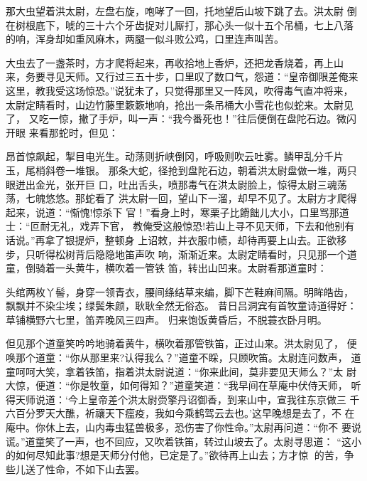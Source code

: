 那大虫望着洪太尉，左盘右旋，咆哮了一回，托地望后山坡下跳了去。洪太尉
倒在树根底下，唬的三十六个牙齿捉对儿厮打，那心头一似十五个吊桶，七上八落
的响，浑身却如重风麻木，两腿一似斗败公鸡，口里连声叫苦。

大虫去了一盏茶时，方才爬将起来，再收拾地上香炉，还把龙香烧着，再上山
来，务要寻见天师。又行过三五十步，口里叹了数口气，怨道：“皇帝御限差俺来
这里，教我受这场惊恐。”说犹未了，只觉得那里又一阵风，吹得毒气直冲将来，
太尉定睛看时，山边竹藤里簌簌地响，抢出一条吊桶大小雪花也似蛇来。太尉见了，
又吃一惊，撇了手炉，叫一声：“我今番死也！”往后便倒在盘陀石边。微闪开眼
来看那蛇时，但见：

昂首惊飙起，掣目电光生。动荡则折峡倒冈，呼吸则吹云吐雾。鳞甲乱分千片
玉，尾梢斜卷一堆银。
那条大蛇，径抢到盘陀石边，朝着洪太尉盘做一堆，两只眼迸出金光，张开巨
口，吐出舌头，喷那毒气在洪太尉脸上，惊得太尉三魂荡荡，七魄悠悠。那蛇看了
洪太尉一回，望山下一溜，却早不见了。太尉方才爬得起来，说道：“惭愧!惊杀下
官！”看身上时，寒栗子比餶飿儿大小，口里骂那道士：“叵耐无礼，戏弄下官，
教俺受这般惊恐!若山上寻不见天师，下去和他别有话说。”再拿了银提炉，整顿身
上诏敕，并衣服巾帻，却待再要上山去。正欲移步，只听得松树背后隐隐地笛声吹
响，渐渐近来。太尉定睛看时，只见那一个道童，倒骑着一头黄牛，横吹着一管铁
笛，转出山凹来。太尉看那道童时：

头绾两枚丫髻，身穿一领青衣，腰间绦结草来编，脚下芒鞋麻间隔。明眸皓齿，
飘飘并不染尘埃；绿鬓朱颜，耿耿全然无俗态。
昔日吕洞宾有首牧童诗道得好：
草铺横野六七里，笛弄晚风三四声。
归来饱饭黄昏后，不脱蓑衣卧月明。

但见那个道童笑吟吟地骑着黄牛，横吹着那管铁笛，正过山来。洪太尉见了，
便唤那个道童：“你从那里来?认得我么？”道童不睬，只顾吹笛。太尉连问数声，
道童呵呵大笑，拿着铁笛，指着洪太尉说道：“你来此间，莫非要见天师么？”太
尉大惊，便道：“你是牧童，如何得知？”道童笑道：“我早间在草庵中伏侍天师，
听得天师说道：‘今上皇帝差个洪太尉赍擎丹诏御香，到来山中，宣我往东京做三
千六百分罗天大醮，祈禳天下瘟疫，我如今乘鹤驾云去也。’这早晚想是去了，不
在庵中。你休上去，山内毒虫猛兽极多，恐伤害了你性命。”太尉再问道：“你不
要说谎。”道童笑了一声，也不回应，又吹着铁笛，转过山坡去了。太尉寻思道：
“这小的如何尽知此事?想是天师分付他，已定是了。”欲待再上山去；方才惊
的苦，争些儿送了性命，不如下山去罢。

